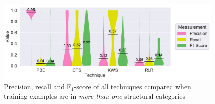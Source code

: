 \documentclass[\myrootdir/main.tex]{subfiles}
\begin{document}
\begin{figure}[htbp]
		\centering
		\includegraphics[width=\textwidth, clip]{img/big-study/recall-precision-multicategory-all.pdf}
		\caption{Precision, recall and F$_{1}$-score of all techniques compared when training examples are in \emph{more than one} structural categories}
		\label{fig:recall-precision-multicategory-all}
\end{figure}
\end{document}
